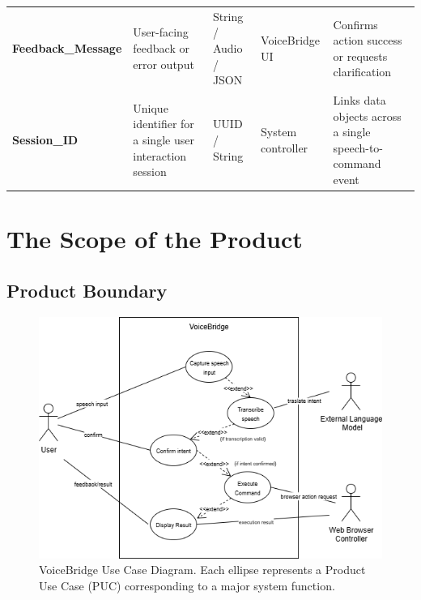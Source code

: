 \documentclass[11pt]{article}
\begin{document}
\begin{tabularx}{\textwidth}{p{3cm} X p{2.8cm} p{2.8cm} X}
\textbf{Feedback\_Message} & User-facing feedback or error output & String / Audio / JSON & VoiceBridge UI & Confirms action success or requests clarification \\

\textbf{Session\_ID} & Unique identifier for a single user interaction session & UUID / String & System controller & Links data objects across a single speech-to-command event \\

\bottomrule
\end{tabularx}


\section{The Scope of the Product}
\subsection{Product Boundary}
\begin{figure}[H]
    \centering
    \includegraphics[width=1.1\textwidth]{..//imgs/VoiceBridge_use_case_diagram.png}
    \caption{VoiceBridge Use Case Diagram. Each ellipse represents a Product Use Case (PUC) corresponding to a major system function.}
    \label{fig:voicebridge-usecase}
\end{figure} 
\end{document}
